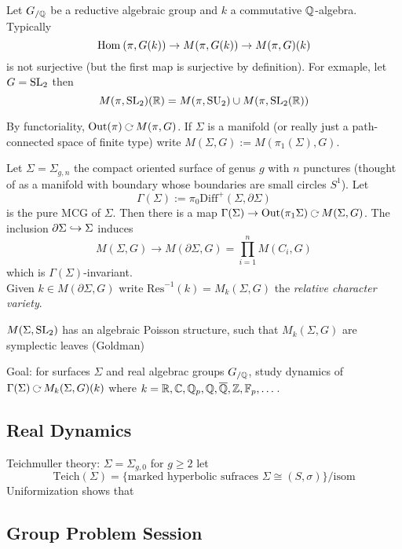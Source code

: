 \documentclass[12pt]{article}
\DeclareMathOperator{\Out}{\mathrm{Out}}
\begin{document}
\begin{rmk}
Let $G_{/\mathbb{Q}}$ be a reductive algebraic group and $k$ a commutative $\mathbb{Q}$-algebra. Typically 
\[ \mathrm{Hom}_{} \left( \pi, G(k) \right) \to M(\pi,G(k)) \to M(\pi, G)(k) \]
is not surjective (but the first map is surjective by definition). For exmaple, let $G = \mathrm{SL}_2$ then 
\[ M(\pi, \mathrm{SL}_2)(\mathbb{R}) = M(\pi, \mathrm{SU}_2) \cup M(\pi, \mathrm{SL}_2(\mathbb{R})) \]
\end{rmk}

\begin{defn}
By functoriality, $\Out(\pi) \acts M(\pi, G)$. If $\Sigma$ is a manifold (or really just a path-connected space of finite type) write $M(\Sigma, G) := M(\pi_1(\Sigma), G)$.
\end{defn}

Let $\Sigma = \Sigma_{g,n}$ the compact oriented surface of genus $g$ with $n$ punctures (thought of as a manifold with boundary whose boundaries are small circles $S^1$). Let 
\[ \Gamma(\Sigma) := \pi_0 \mathrm{Diff}^+(\Sigma, \partial \Sigma) \]
is the pure MCG of $\Sigma$. Then there is a map $\Gamma(\Sigma) \to \Out(\pi_1 \Sigma) \acts M(\Sigma, G)$. The inclusion $\partial \Sigma \hookrightarrow \Sigma$ induces
\[ M(\Sigma, G) \to M(\partial \Sigma, G) = \prod_{i = 1}^n M(C_i, G) \]
which is $\Gamma(\Sigma)$-invariant.
\\
Given $k \in M(\partial \Sigma, G)$ write $\mathrm{Res}^{-1}(k) = M_k(\Sigma, G)$ the \textit{relative character variety}.

\begin{rmk}
$M(\Sigma, \mathrm{SL}_2)$ has an algebraic Poisson structure, such that $M_k(\Sigma, G)$ are symplectic leaves (Goldman)
\end{rmk}

Goal: for surfaces $\Sigma$ and real algebrac groups $G_{/\mathbb{Q}}$, study dynamics of $\Gamma(\Sigma) \acts M_k(\Sigma, G)(k)$ where $k = \mathbb{R}, \mathbb{C}, \mathbb{Q}_p, \mathbb{Q}, \overline{\mathbb{Q}}, \mathbb{Z}, \mathbb{F}_p, \dots$.

\subsection{Real Dynamics}

\newcommand{\Teich}{\mathrm{Teich}}

Teichmuller theory: $\Sigma = \Sigma_{g,0}$ for $g \ge 2$ let
\[ \Teich(\Sigma) = \{ \text{marked hyperbolic sufraces } \Sigma \cong (S, \sigma) \} / \text{isom} \]
Uniformization shows that 

\newpage


\subsection{Group Problem Session}
\end{document}
